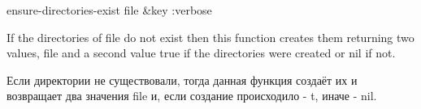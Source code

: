 \begin{defun}[Function]
ensure-directories-exist file &key :verbose

If the directories of file do not exist then this function creates them
returning two values, file and a second value true if the directories were
created or nil if not.

Если директории не существовали, тогда данная функция создаёт их и возвращает
два значения file и, если создание происходило - t, иначе - nil.
\end{defun}

